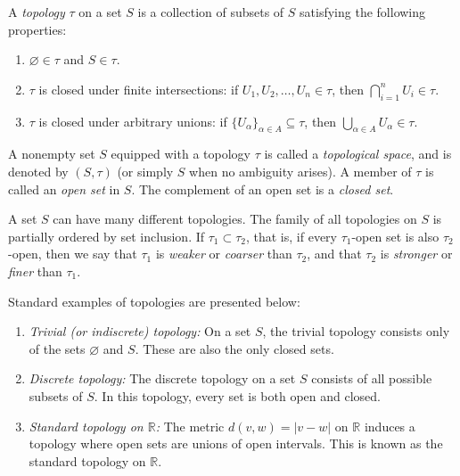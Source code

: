 \begin{definition}
  A \emph{topology} $\tau$ on a set $S$ is a collection of subsets of $S$ satisfying the following properties:
\begin{enumerate}
    \item $\varnothing \in \tau$ and $S \in \tau$.
    \item $\tau$ is closed under finite intersections: if $U_1, U_2, \dots, U_n \in \tau$, then $\bigcap_{i=1}^n U_i \in \tau$.
    \item $\tau$ is closed under arbitrary unions: if $\{U_\alpha\}_{\alpha \in A} \subseteq \tau$, then $\bigcup_{\alpha \in A} U_\alpha \in \tau$.
\end{enumerate}

A nonempty set $S$ equipped with a topology $\tau$ is called a \emph{topological space}, and is denoted by $(S, \tau)$ (or simply $S$ when no ambiguity arises). A member of $\tau$ is called an \emph{open set} in $S$. The complement of an open set is a \emph{closed set}. 

A set \( S \) can have many different topologies.  
The family of all topologies on \( S \) is partially ordered by set inclusion.  
If \( \tau_1 \subset \tau_2 \), that is, if every \( \tau_1 \)-open set is also \( \tau_2 \)-open,  
then we say that \( \tau_1 \) is \emph{weaker} or \emph{coarser} than \( \tau_2 \),  
and that \( \tau_2 \) is \emph{stronger} or \emph{finer} than \( \tau_1 \).
\end{definition}

\begin{example}
Standard examples of topologies are presented below:
\begin{enumerate}
    \item \emph{Trivial (or indiscrete) topology:} On a set $S$, the trivial topology consists only of the sets $\varnothing$ and $S$. These are also the only closed sets.
    
    \item \emph{Discrete topology:} The discrete topology on a set $S$ consists of all possible subsets of $S$. In this topology, every set is both open and closed.
    
    \item \emph{Standard topology on $\mathbb{R}$:} The metric $d(v, w) = |v - w|$ on $\mathbb{R}$ induces a topology where open sets are unions of open intervals. This is known as the standard topology on $\mathbb{R}$.
\end{enumerate}
\end{example}


